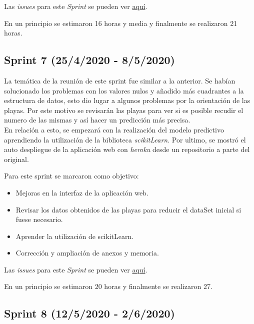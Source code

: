 Las \emph{issues} para este \emph{Sprint} se pueden ver \href{https://github.com/psnti/TFG-Pablo-Santidrian-Tudanca/milestone/6}{aquí}.


En un principio se estimaron 16 horas y media y finalmente se realizaron 21 horas.

\subsection{Sprint 7 (25/4/2020 - 8/5/2020)}\label{Sprint-5}

La temática de la reunión de este sprint fue similar a la anterior. Se habían solucionado los problemas con los valores nulos y añadido más cuadrantes a la estructura de datos, esto dio lugar a algunos problemas por la orientación de las playas. Por este motivo se revisarán las playas para ver si es posible recudir el numero de las mismas y así hacer un predicción más precisa.\\
En relación a esto, se empezará con la realización del modelo predictivo aprendiendo la utilización de la biblioteca \emph{scikitLearn}.
Por ultimo, se mostró el auto despliegue de la aplicación web con \emph{heroku} desde un repositorio a parte del original.

Para este sprint se marcaron como objetivo:
\begin{itemize}
	\item Mejoras en la interfaz de la aplicación web.
	\item Revisar los datos obtenidos de las playas para reducir el dataSet inicial si fuese necesario.
	\item Aprender la utilización de scikitLearn.
	\item Corrección y ampliación de anexos y memoria.
\end{itemize} 

Las \emph{issues} para este \emph{Sprint} se pueden ver \href{https://github.com/psnti/TFG-Pablo-Santidrian-Tudanca/milestone/7}{aquí}.


En un principio se estimaron 20 horas y finalmente se realizaron 27.

\subsection{Sprint 8 (12/5/2020 - 2/6/2020)}\label{Sprint-5}

